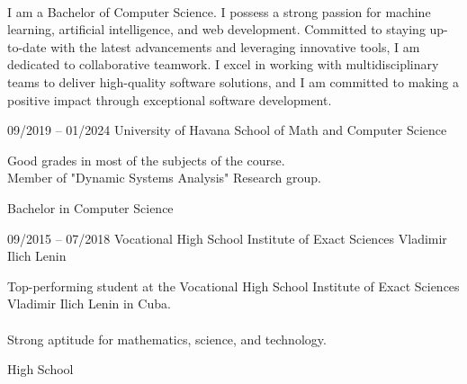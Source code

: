 \documentclass[9pt, blue]{./template/developercv} %
\begin{document}


\vspace{8pt}
\\
I am a Bachelor of Computer Science. I possess a strong passion for machine learning, artificial intelligence, and web development. Committed to staying up-to-date with the latest advancements and leveraging innovative tools, I am dedicated to collaborative teamwork. I excel in working with multidisciplinary teams to deliver high-quality software solutions, and I am committed to making a positive impact through exceptional software development.






\vspace{2.1mm}
\begin{entrylist}
	\entry
	{09/2019 – 01/2024}
	{University of Havana}
	{School of Math and Computer Science}
	{
		\vspace{0.3mm}
		\begin{minipage}[t]{0.75\textwidth}
			\vspace{-\baselineskip}
			\itemmarker Good grades in most of the subjects of the course.\\
			\itemmarker Member of "Dynamic Systems Analysis" Research group. \\


		\end{minipage}
	}
	{Bachelor in Computer Science}



	\entry
		{09/2015 – 07/2018}
		{}
		{Vocational High School Institute of Exact Sciences Vladimir Ilich Lenin}
		{
			\vspace{0.3mm}
			\begin{minipage}[t]{0.75\textwidth}
				\vspace{-\baselineskip}
				\itemmarker Top-performing student at the Vocational High School Institute of Exact Sciences Vladimir Ilich Lenin in Cuba.\\
				\vspace{-3mm}\\
				\itemmarker Strong aptitude for mathematics, science, and technology. \\
				\vspace{-20mm}
			\end{minipage}
	   }
		{High School}
\end{entrylist}
\end{document}
